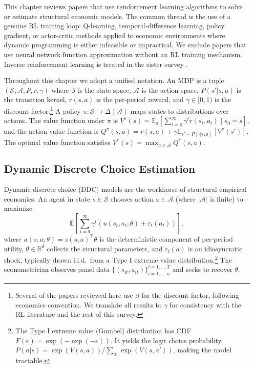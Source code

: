 This chapter reviews papers that use reinforcement learning algorithms to solve or estimate structural economic models. The common thread is the use of a genuine RL training loop: Q-learning, temporal-difference learning, policy gradient, or actor-critic methods applied to economic environments where dynamic programming is either infeasible or impractical. We exclude papers that use neural network function approximation without an RL training mechanism. Inverse reinforcement learning is treated in the sister survey \citep{RustRawat2026}.

Throughout this chapter we adopt a unified notation. An MDP is a tuple $(\mathcal{S}, \mathcal{A}, P, r, \gamma)$ where $\mathcal{S}$ is the state space, $\mathcal{A}$ is the action space, $P(s' | s, a)$ is the transition kernel, $r(s,a)$ is the per-period reward, and $\gamma \in [0,1)$ is the discount factor.\footnote{Several of the papers reviewed here use $\beta$ for the discount factor, following economics convention. We translate all results to $\gamma$ for consistency with the RL literature and the rest of this survey.} A policy $\pi: \mathcal{S} \to \Delta(\mathcal{A})$ maps states to distributions over actions. The value function under $\pi$ is $V^\pi(s) = \mathbb{E}_\pi\left[\sum_{t=0}^\infty \gamma^t r(s_t, a_t) \mid s_0 = s\right]$, and the action-value function is $Q^\pi(s,a) = r(s,a) + \gamma \mathbb{E}_{s' \sim P(\cdot|s,a)}[V^\pi(s')]$. The optimal value function satisfies $V^*(s) = \max_{a \in \mathcal{A}} Q^*(s,a)$.


\subsection{Dynamic Discrete Choice Estimation}

Dynamic discrete choice (DDC) models are the workhorse of structural empirical economics. An agent in state $s \in \mathcal{S}$ chooses action $a \in \mathcal{A}$ (where $|\mathcal{A}|$ is finite) to maximize
\begin{equation}
\mathbb{E}\left[\sum_{t=0}^\infty \gamma^t \left(u(s_t, a_t; \theta) + \varepsilon_t(a_t)\right)\right],
\end{equation}
where $u(s,a;\theta) = z(s,a)^\top \theta$ is the deterministic component of per-period utility, $\theta \in \mathbb{R}^d$ collects the structural parameters, and $\varepsilon_t(a)$ is an idiosyncratic shock, typically drawn i.i.d.\ from a Type I extreme value distribution.\footnote{The Type I extreme value (Gumbel) distribution has CDF $F(\varepsilon) = \exp(-\exp(-\varepsilon))$. It yields the logit choice probability $P(a|s) = \exp(V(s,a))/\sum_{a'}\exp(V(s,a'))$, making the model tractable.} The econometrician observes panel data $\{(s_{it}, a_{it})\}_{i=1,\ldots,n}^{t=1,\ldots,T}$ and seeks to recover $\theta$.

